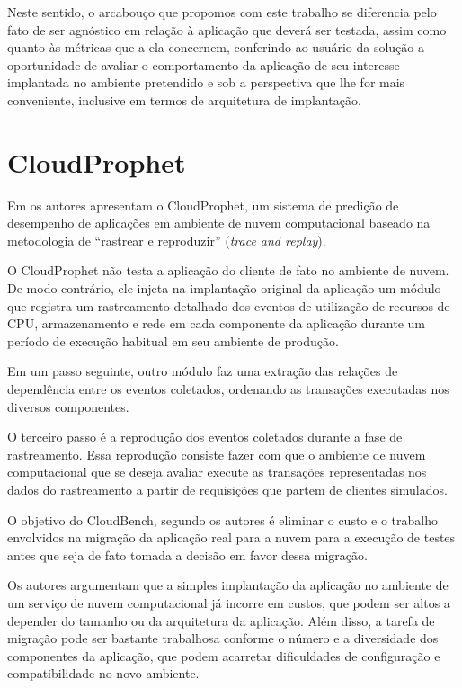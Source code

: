 Neste sentido, o arcabouço que propomos com este trabalho se diferencia pelo fato
de ser agnóstico em relação à aplicação que deverá ser testada, assim como quanto 
às métricas que a ela concernem, conferindo ao usuário da solução a oportunidade 
de avaliar o comportamento da aplicação de seu interesse implantada no ambiente
pretendido e sob a perspectiva que lhe for mais conveniente, inclusive em termos
de arquitetura de implantação. 

\section{CloudProphet}
Em \cite{li2011cloudprophet} os autores apresentam o CloudProphet, um sistema de
predição de desempenho de aplicações em ambiente de nuvem computacional baseado 
na metodologia de ``rastrear e reproduzir'' (\textit{trace and replay}).

O CloudProphet não testa a aplicação do cliente de fato no ambiente de nuvem. De
modo contrário, ele injeta na implantação original da aplicação um módulo que 
registra um rastreamento detalhado dos eventos de utilização de recursos de CPU,
armazenamento e rede em cada componente da aplicação durante um período de 
execução habitual em seu ambiente de produção.

Em um passo seguinte, outro módulo faz uma extração das relações de dependência 
entre os eventos coletados, ordenando as transações executadas nos diversos 
componentes.

O terceiro passo é a reprodução dos eventos coletados durante a fase de 
rastreamento. Essa reprodução consiste fazer com que o ambiente de nuvem 
computacional que se deseja avaliar execute as transações representadas nos dados
do rastreamento a partir de requisições que partem de clientes simulados.
   
O objetivo do CloudBench, segundo os autores é eliminar o custo e o trabalho 
envolvidos na migração da aplicação real para a nuvem para a execução de testes 
antes que seja de fato tomada a decisão em favor dessa migração.

Os autores argumentam que a simples implantação da aplicação no ambiente de um
serviço de nuvem computacional já incorre em custos, que podem ser altos a 
depender do tamanho ou da arquitetura da aplicação. Além disso, a tarefa de
migração pode ser bastante trabalhosa conforme o número e a diversidade dos 
componentes da aplicação, que podem acarretar dificuldades de configuração e
compatibilidade no novo ambiente.





